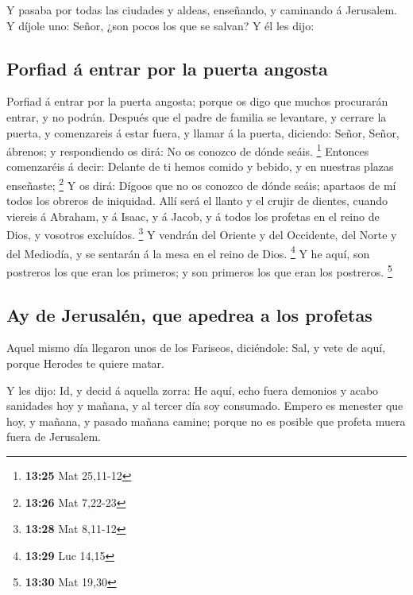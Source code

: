  Y pasaba por todas las ciudades y aldeas, enseñando, y
caminando á Jerusalem.  Y díjole uno: Señor, ¿son pocos
los que se salvan? Y él les dijo:

\hypertarget{porfiad-uxe1-entrar-por-la-puerta-angosta}{%
\subsection{Porfiad á entrar por la puerta
angosta}\label{porfiad-uxe1-entrar-por-la-puerta-angosta}}

 Porfiad á entrar por la puerta angosta; porque os digo
que muchos procurarán entrar, y no podrán.  Después que
el padre de familia se levantare, y cerrare la puerta, y comenzareis á
estar fuera, y llamar á la puerta, diciendo: Señor, Señor, ábrenos; y
respondiendo os dirá: No os conozco de dónde seáis. \footnote{\textbf{13:25}
  Mat 25,11-12}  Entonces comenzaréis á decir: Delante de
ti hemos comido y bebido, y en nuestras plazas enseñaste; \footnote{\textbf{13:26}
  Mat 7,22-23}  Y os dirá: Dígoos que no os conozco de
dónde seáis; apartaos de mí todos los obreros de iniquidad.
 Allí será el llanto y el crujir de dientes, cuando
viereis á Abraham, y á Isaac, y á Jacob, y á todos los profetas en el
reino de Dios, y vosotros excluídos. \footnote{\textbf{13:28} Mat
  8,11-12}  Y vendrán del Oriente y del Occidente, del
Norte y del Mediodía, y se sentarán á la mesa en el reino de Dios.
\footnote{\textbf{13:29} Luc 14,15}  Y he aquí, son
postreros los que eran los primeros; y son primeros los que eran los
postreros. \footnote{\textbf{13:30} Mat 19,30}

\hypertarget{ay-de-jerusaluxe9n-que-apedrea-a-los-profetas}{%
\subsection{Ay de Jerusalén, que apedrea a los
profetas}\label{ay-de-jerusaluxe9n-que-apedrea-a-los-profetas}}

 Aquel mismo día llegaron unos de los Fariseos,
diciéndole: Sal, y vete de aquí, porque Herodes te quiere matar.

 Y les dijo: Id, y decid á aquella zorra: He aquí, echo
fuera demonios y acabo sanidades hoy y mañana, y al tercer día soy
consumado.  Empero es menester que hoy, y mañana, y
pasado mañana camine; porque no es posible que profeta muera fuera de
Jerusalem.

